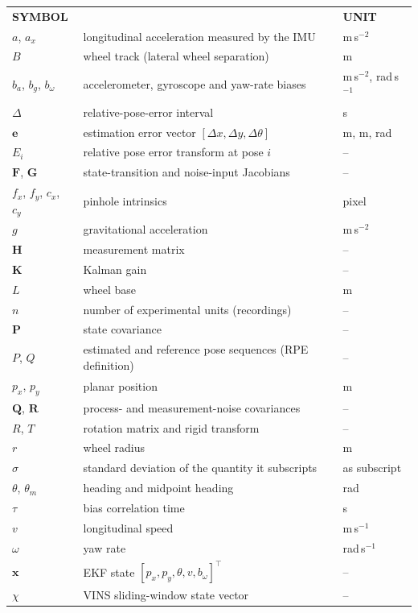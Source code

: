 
\noindent
\begin{tabular}{@{}p{}p{}p{}@{}}
\textbf{SYMBOL} & & \textbf{UNIT} \\[4pt]
$a$, $a_x$ & longitudinal acceleration measured by the IMU & m\,s$^{-2}$ \\
$B$ & wheel track (lateral wheel separation) & m \\
$b_a$, $b_g$, $b_\omega$ & accelerometer, gyroscope and yaw-rate biases & m\,s$^{-2}$, rad\,s$^{-1}$ \\
$\Delta$ & relative-pose-error interval & s \\
$\mathbf{e}$ & estimation error vector $[\Delta x,\Delta y,\Delta\theta]$ & m, m, rad \\
$E_i$ & relative pose error transform at pose $i$ & -- \\
$\mathbf{F}$, $\mathbf{G}$ & state-transition and noise-input Jacobians & -- \\
$f_x$, $f_y$, $c_x$, $c_y$ & pinhole intrinsics & pixel \\
$g$ & gravitational acceleration & m\,s$^{-2}$ \\
$\mathbf{H}$ & measurement matrix & -- \\
$\mathbf{K}$ & Kalman gain & -- \\
$L$ & wheel base & m \\
$n$ & number of experimental units (recordings) & -- \\
$\mathbf{P}$ & state covariance & -- \\
$P$, $Q$ & estimated and reference pose sequences (RPE definition) & -- \\
$p_x$, $p_y$ & planar position & m \\
$\mathbf{Q}$, $\mathbf{R}$ & process- and measurement-noise covariances & -- \\
$R$, $T$ & rotation matrix and rigid transform & -- \\
$r$ & wheel radius & m \\
$\sigma$ & standard deviation of the quantity it subscripts & as subscript \\
$\theta$, $\theta_m$ & heading and midpoint heading & rad \\
$\tau$ & bias correlation time & s \\
$v$ & longitudinal speed & m\,s$^{-1}$ \\
$\omega$ & yaw rate & rad\,s$^{-1}$ \\
$\mathbf{x}$ & EKF state $[p_x,p_y,\theta,v,b_\omega]^{\top}$ & -- \\
$\chi$ & VINS sliding-window state vector & -- \\
\end{tabular}

